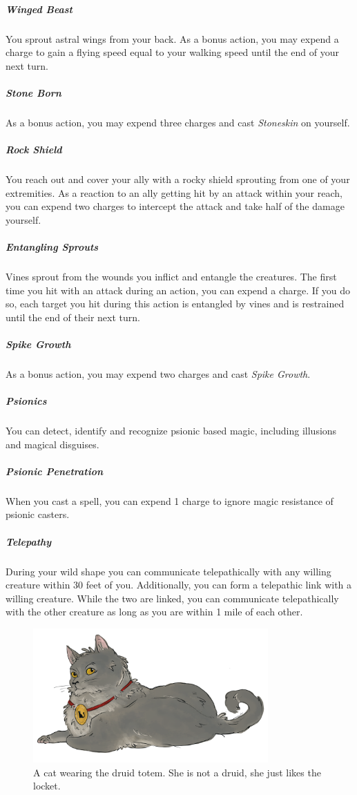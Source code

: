 \documentclass[letter,10pt,twocolumn,openany]{dndbook}
\begin{document}
\subparagraph{Winged Beast}
You sprout astral wings from your back.
As a bonus action, you may expend a charge to gain a flying speed equal to your walking speed until the end of your next turn.


\subparagraph{Stone Born}
As a bonus action, you may expend three charges and cast \textit{Stoneskin} on yourself.

\subparagraph{Rock Shield}
You reach out and cover your ally with a rocky shield sprouting from one of your extremities.
As a reaction to an ally getting hit by an attack within your reach, you can expend two charges to intercept the attack and take half of the damage yourself.


\subparagraph{Entangling Sprouts}
Vines sprout from the wounds you inflict and entangle the creatures.
The first time you hit with an attack during an action, you can expend a charge.
If you do so, each target you hit during this action is entangled by vines and is restrained until the end of their next turn.

\subparagraph{Spike Growth}
As a bonus action, you may expend two charges and cast \textit{Spike Growth}.


\subparagraph{Psionics}
You can detect, identify and recognize psionic based magic, including illusions and magical disguises.

\subparagraph{Psionic Penetration}
When you cast a spell, you can expend 1 charge to ignore magic resistance of psionic casters.

\subparagraph{Telepathy}
During your wild shape you can communicate telepathically with any willing creature within 30 feet of you.
Additionally, you can form a telepathic link with a willing creature.
While the two are linked, you can communicate telepathically with the other creature as long as you are within 1 mile of each other.

\begin{figure}
    \includegraphics[width=9cm]{images/cat.png}
    \caption{A cat wearing the druid totem. She is not a druid, she just likes the locket.}
\end{figure}
\end{document}
